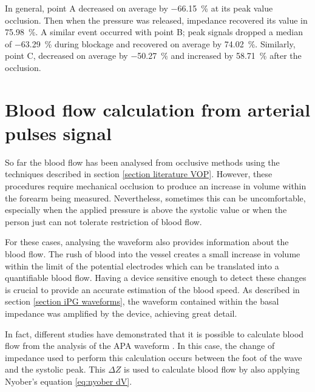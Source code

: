 In general, point A decreased on average by \SI{-66.15}{\percent} at its peak value occlusion. Then when the pressure was released, impedance recovered its value in \SI{75.98}{\percent}. A similar event occurred with point B; peak signals dropped a median of \SI{-63.29}{\percent} during blockage and recovered on average by \SI{74.02}{\percent}. Similarly, point C, decreased on average by \SI{-50.27}{\percent}  and increased by \SI{58.71}{\percent} after the occlusion.

\section{Blood flow calculation from arterial pulses signal}
\label{section apa flow arterial pulses}
So far the blood flow has been analysed from occlusive methods using the techniques described in section \ref{section literature VOP}. However, these procedures require mechanical occlusion to produce an increase in volume within the forearm being measured. Nevertheless, sometimes this can be uncomfortable, especially when the applied pressure is above the systolic value or when the person just can not tolerate restriction of blood flow.

For these cases, analysing the waveform also provides information about the blood flow. The rush of blood into the vessel creates a small increase in volume within the limit of the potential electrodes which can be translated into a quantifiable blood flow. Having a device sensitive enough to detect these changes is crucial to provide an accurate estimation of the blood speed. As described in section \ref{section iPG waveforms}, the waveform contained within the basal impedance was amplified by the device, achieving great detail.

In fact, different studies have demonstrated that it is possible to calculate blood flow from the analysis of the APA waveform \cite{corciova2011peripheral, costeloe1980continuous, brown1975impedance}. In this case, the change of impedance used to perform this calculation occurs between the foot of the wave and the systolic peak. This $\Delta Z$ is used to calculate blood flow by also applying Nyober's equation \ref{eq:nyober dV}.

